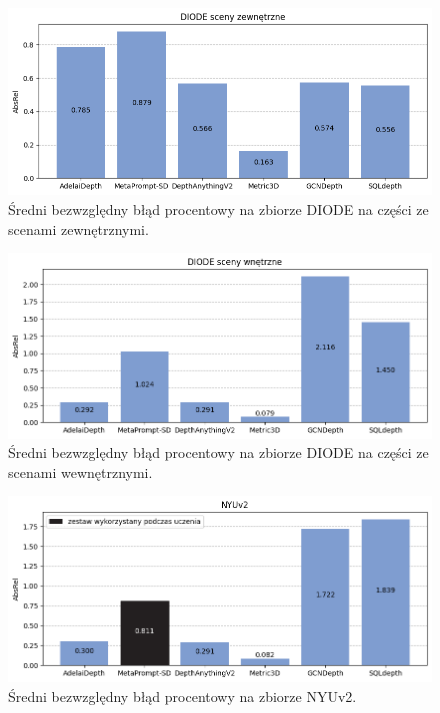 \begin{figure}[H]
    \centering
    \includegraphics{plots/absrel/0}
    \caption{Średni bezwzględny błąd procentowy na zbiorze DIODE na części ze scenami zewnętrznymi.}
    \label{fig:absrel_0}
\end{figure}
\begin{figure}[H]
    \centering
    \includegraphics{plots/absrel/1}
    \caption{Średni bezwzględny błąd procentowy na zbiorze DIODE na części ze scenami wewnętrznymi.}
    \label{fig:absrel_1}
\end{figure}
\begin{figure}[H]
    \centering
    \includegraphics{plots/absrel/2}
    \caption{Średni bezwzględny błąd procentowy na zbiorze NYUv2.}
    \label{fig:absrel_2}
\end{figure}
